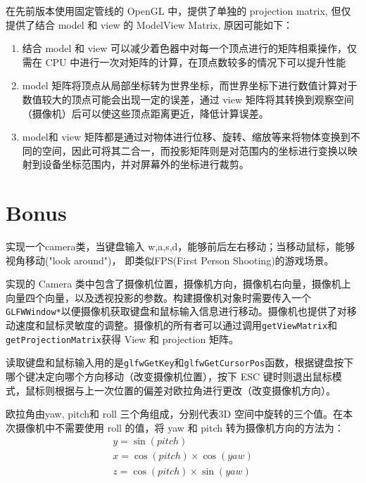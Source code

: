 \documentclass[12pt]{article}
\begin{document}
\begin{enumerate}
    在先前版本使用固定管线的 OpenGL 中，提供了单独的 projection matrix, 但仅提供了结合 model 和 view 的 ModelView Matrix, 原因可能如下：
    \begin{enumerate}
        \item 结合 model 和 view 可以减少着色器中对每一个顶点进行的矩阵相乘操作，仅需在 CPU 中进行一次对矩阵的计算，在顶点数较多的情况下可以提升性能
        \item model 矩阵将顶点从局部坐标转为世界坐标，而世界坐标下进行数值计算对于数值较大的顶点可能会出现一定的误差，通过 view 矩阵将其转换到观察空间（摄像机）后可以使这些顶点距离更近，降低计算误差。
        \item model和 view 矩阵都是通过对物体进行位移、旋转、缩放等来将物体变换到不同的空间，因此可将其二合一，而投影矩阵则是对范围内的坐标进行变换以映射到设备坐标范围内，并对屏幕外的坐标进行裁剪。
    \end{enumerate}
\end{enumerate}

\section{Bonus}
实现一个camera类，当键盘输入 w,a,s,d，能够前后左右移动；当移动鼠标，能够视角移动("look around")， 即类似FPS(First Person Shooting)的游戏场景。

实现的 Camera 类中包含了摄像机位置，摄像机方向，摄像机右向量，摄像机上向量四个向量，以及透视投影的参数。构建摄像机对象时需要传入一个\lstinline{GLFWWindow*}以便摄像机获取键盘和鼠标输入信息进行移动。摄像机也提供了对移动速度和鼠标灵敏度的调整。摄像机的所有者可以通过调用\lstinline{getViewMatrix}和\lstinline{getProjectionMatrix}获得 View 和 projection 矩阵。

读取键盘和鼠标输入用的是\lstinline{glfwGetKey}和\lstinline{glfwGetCursorPos}函数，根据键盘按下哪个键决定向哪个方向移动（改变摄像机位置），按下 ESC 键时则退出鼠标模式，鼠标则根据与上一次位置的偏差对欧拉角进行更改（改变摄像机方向）。

欧拉角由yaw, pitch和 roll 三个角组成，分别代表3D 空间中旋转的三个值。在本次摄像机中不需要使用 roll 的值，将 yaw 和 pitch 转为摄像机方向的方法为：
\begin{equation}
    \begin{aligned}
        y=\sin (pitch)\\
        x=\cos (pitch)\times \cos (yaw)\\
        z=\cos (pitch)\times \sin (yaw)
    \end{aligned}
\end{equation}
\end{document}
